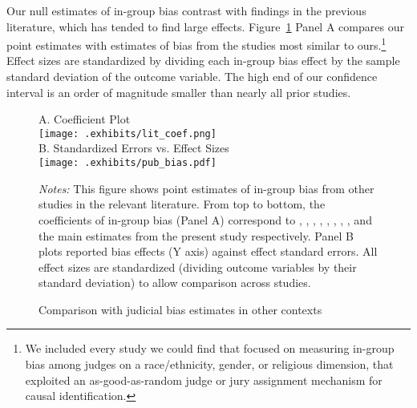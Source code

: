 \documentclass[12pt,english]{article}
\begin{document}
Our null estimates of in-group bias contrast with findings in the previous literature, which has tended to find large effects. Figure~\ref{fig:literature} Panel A compares our point estimates with estimates of bias from the studies most similar to ours.\footnote{We included every study we could find that focused on measuring in-group bias among judges on a race/ethnicity, gender, or religious dimension, that exploited an as-good-as-random judge or jury assignment mechanism for causal identification.} Effect sizes are standardized by dividing each in-group bias effect by the sample standard deviation of the outcome variable. The high end of our confidence interval is an order of magnitude smaller than nearly all prior studies.

\begin{figure}%
  \begin{center}
    \caption{Comparison with judicial bias estimates in other contexts}
    \label{fig:literature}
    A. Coefficient Plot \\ 
    \texttt{[image: .exhibits/lit\_coef.png]} \\ 
    \vspace{1cm}
    B. Standardized Errors vs. Effect Sizes \\ 
    \texttt{[image: .exhibits/pub\_bias.pdf]} \\
  \end{center}
   \begin{minipage}{1.0\textwidth}
   \footnotesize \emph{Notes:} This figure shows point estimates of in-group bias from other studies in the relevant literature. From top to bottom, the coefficients of in-group bias (Panel A) correspond to \cite{ShayoZussman2011QJE}, \cite{AnwarBayerHjalmarsson2012TQJoE}, 
    \cite{depew2017judges},
   \cite{knepper2018shadow}, \cite{sloane2019racial}, \cite{Didwania2018CLE}, \cite{lim2016judges}, 
   \cite{gazal2010let}, and the main estimates from the present study respectively. Panel B plots reported bias effects (Y axis) against effect standard errors. All effect sizes are standardized (dividing outcome variables by their standard deviation) to allow comparison across studies.
   \par 
   \end{minipage}
\end{figure}
\end{document}
